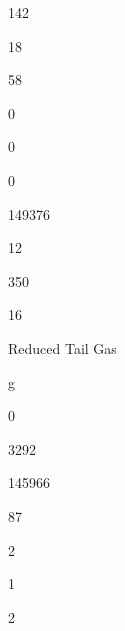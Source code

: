 \documentclass[a4paper,portrait,12pt]{article}
\begin{document}
142





18





58





0





0





0





149376





12





350





16





\begin{flushleft}
Reduced Tail Gas
\end{flushleft}





\begin{flushleft}
g
\end{flushleft}





0





3292





145966





87





2





1





2
\end{document}
